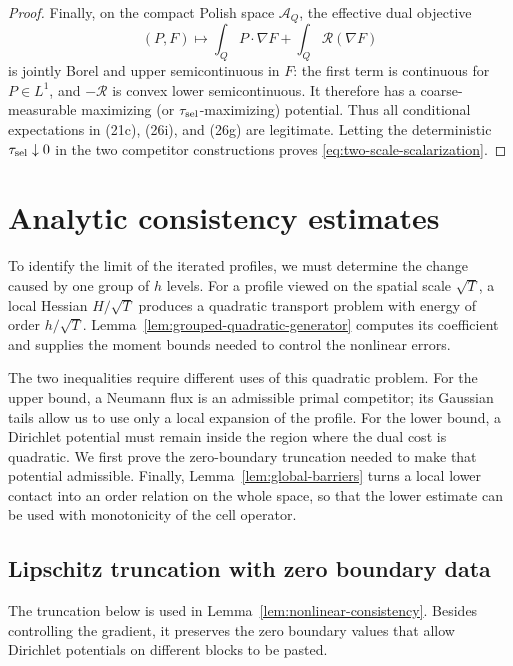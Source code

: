 \documentclass{smfart}
\theoremstyle{definition}
\newcommand{\1}{\mathbf 1}
\begin{document}
\begin{proof}
Finally, on the compact Polish space $\mathscr A_ Q$, the effective
dual objective
\begin{equation}
(P,F)\longmapsto\int_ QP\cdot\nabla F+\int_ Q\mathcal R(\nabla F)
\tag{26s}
\end{equation}
is jointly Borel and upper semicontinuous in $F$: the first term is
continuous for $P\in L^1$, and $-\mathcal R$ is convex lower
semicontinuous.  It therefore has a coarse-measurable maximizing (or
$\tau_{\rm sel}$-maximizing) potential.  Thus all conditional expectations in
(21c), (26i), and (26g) are legitimate.  Letting the deterministic
$\tau_{\rm sel}\downarrow0$ in the two
competitor constructions proves \eqref{eq:two-scale-scalarization}.

\end{proof}

\section{Analytic consistency estimates}\label{sec:consistency}

To identify the limit of the iterated profiles, we must determine the
change caused by one group of $h$ levels.  For a profile viewed on the
spatial scale $\sqrt T$, a local Hessian $H/\sqrt T$ produces a
quadratic transport problem with energy of order $h/\sqrt T$.
Lemma~\ref{lem:grouped-quadratic-generator} computes its coefficient
and supplies the moment bounds needed to control the nonlinear errors.

The two inequalities require different uses of this quadratic problem.
For the upper bound, a Neumann flux is an admissible primal competitor;
its Gaussian tails allow us to use only a local expansion of the
profile.  For the lower bound, a Dirichlet potential must remain inside
the region where the dual cost is quadratic.  We first prove the
zero-boundary truncation needed to make that potential admissible.
Finally, Lemma~\ref{lem:global-barriers} turns a local lower contact
into an order relation on the whole space, so that the lower estimate
can be used with monotonicity of the cell operator.

\subsection{Lipschitz truncation with zero boundary data}

The truncation below is used in Lemma~\ref{lem:nonlinear-consistency}.
Besides controlling the gradient, it preserves the zero boundary values
that allow Dirichlet potentials on different blocks to be pasted.
\end{document}
